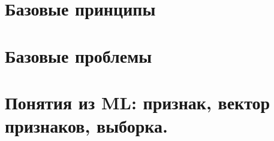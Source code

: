 \section{Базовые принципы}\label{section:base_principles}







\section{Базовые проблемы}\label{sections:base_problems}






\section{Понятия из ML: признак, вектор признаков, выборка.}\label{section:ml_defs}



